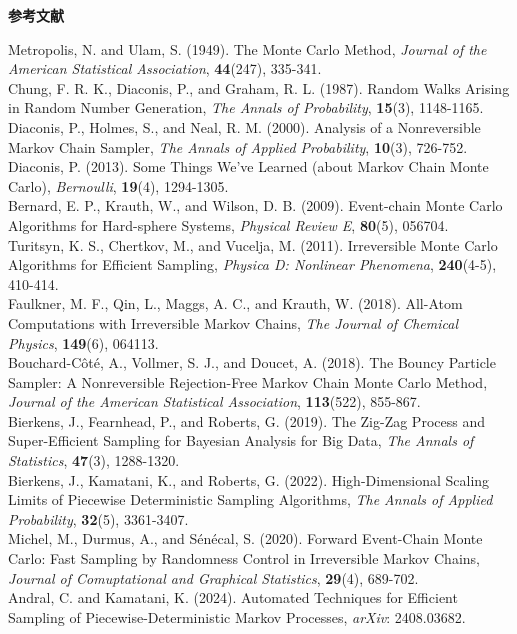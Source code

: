 \documentclass[leqno,a4j]{jarticle}
\numberwithin{equation}{section}
\begin{document}
\begin{center}
\textbf{\large{参考文献}}
\end{center}
Metropolis, N. and Ulam, S. (1949). The Monte Carlo Method, \textit{Journal of the American Statistical Association}, \textbf{44}(247), 335-341.\\
Chung, F. R. K., Diaconis, P., and Graham, R. L. (1987). Random Walks Arising in Random Number Generation, \textit{The Annals of Probability}, \textbf{15}(3), 1148-1165.\\
Diaconis, P., Holmes, S., and Neal, R. M. (2000). Analysis of a Nonreversible Markov Chain Sampler, \textit{The Annals of Applied Probability}, \textbf{10}(3), 726-752.\\
Diaconis, P. (2013). Some Things We’ve Learned (about Markov Chain Monte Carlo), \textit{Bernoulli}, \textbf{19}(4), 1294-1305.\\
Bernard, E. P., Krauth, W., and Wilson, D. B. (2009). Event-chain Monte Carlo Algorithms for Hard-sphere Systems, \textit{Physical Review E}, \textbf{80}(5), 056704.\\
Turitsyn, K. S., Chertkov, M., and Vucelja, M. (2011). Irreversible Monte Carlo Algorithms for Efficient Sampling, \textit{Physica D: Nonlinear Phenomena}, \textbf{240}(4-5), 410-414.\\
Faulkner, M. F., Qin, L., Maggs, A. C., and Krauth, W. (2018). All-Atom Computations with Irreversible Markov Chains, \textit{The Journal of Chemical Physics}, \textbf{149}(6), 064113.\\
Bouchard-Côté, A., Vollmer, S. J., and Doucet, A. (2018). The Bouncy Particle Sampler: A Nonreversible Rejection-Free Markov Chain Monte Carlo Method, \textit{Journal of the American Statistical Association}, \textbf{113}(522), 855-867.\\
Bierkens, J., Fearnhead, P., and Roberts, G. (2019). The Zig-Zag Process and Super-Efficient Sampling for Bayesian Analysis for Big Data, \textit{The Annals of Statistics}, \textbf{47}(3), 1288-1320.\\
Bierkens, J., Kamatani, K., and Roberts, G. (2022). High-Dimensional Scaling Limits of Piecewise Deterministic Sampling Algorithms, \textit{The Annals of Applied Probability}, \textbf{32}(5), 3361-3407.\\
Michel, M., Durmus, A., and Sénécal, S. (2020). Forward Event-Chain Monte Carlo: Fast Sampling by Randomness Control in Irreversible Markov Chains, \textit{Journal of Comuptational and Graphical Statistics}, \textbf{29}(4), 689-702.\\
Andral, C. and Kamatani, K. (2024). Automated Techniques for Efficient Sampling of Piecewise-Deterministic Markov Processes, \textit{arXiv}: 2408.03682.
\end{document}
